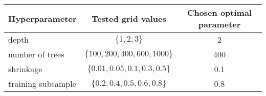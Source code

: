 \begin{tabular}{l|c|c|}
    Hyperparameter     & Tested grid values       & Chosen optimal parameter \\
    \hline 
    depth              & $\{1,2,3\}$                  & 2    \\
    number of trees    & $\{100, 200, 400, 600, 1000\}$ & 400  \\
    shrinkage          & $\{0.01, 0.05, 0.1, 0.3 ,0.5\}$          & 0.1  \\
    training subsample & $\{0.2, 0.4, 0.5, 0.6, 0.8\}$  & 0.8  \\
\end{tabular}
